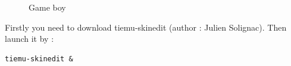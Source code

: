 \documentclass[10pt]{report}
\begin{document}
\begin{figure}[H]
\centering
{}
\caption{Game boy}
\end{figure}

Firstly you need to download tiemu-skinedit (author : Julien Solignac).\newline
Then launch it by :\newline
\begin{lstlisting}
tiemu-skinedit &
\end{lstlisting}
\end{document}
